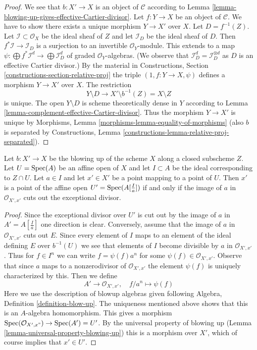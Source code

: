 \begin{proof}
We see that $b : X' \to X$ is an object of $\mathcal{C}$ according to
Lemma \ref{lemma-blowing-up-gives-effective-Cartier-divisor}.
Let $f : Y \to X$ be an object of $\mathcal{C}$. We have to show there exists
a unique morphism $Y \to X'$ over $X$. Let $D = f^{-1}(Z)$.
Let $\mathcal{I} \subset \mathcal{O}_X$ be the ideal sheaf of $Z$
and let $\mathcal{I}_D$ be the ideal sheaf of $D$. Then
$f^*\mathcal{I} \to \mathcal{I}_D$ is a surjection
to an invertible $\mathcal{O}_Y$-module. This extends to a map
$\psi : \bigoplus f^*\mathcal{I}^d \to \bigoplus \mathcal{I}_D^d$
of graded $\mathcal{O}_Y$-algebras. (We observe that
$\mathcal{I}_D^d = \mathcal{I}_D^{\otimes d}$ as $D$ is an
effective Cartier divisor.) By the material in
Constructions, Section \ref{constructions-section-relative-proj}
the triple $(1, f : Y \to X, \psi)$ defines a morphism $Y \to X'$ over $X$.
The restriction
$$
Y \setminus D \longrightarrow X' \setminus b^{-1}(Z) = X \setminus Z
$$
is unique. The open $Y \setminus D$ is scheme theoretically dense in $Y$
according to Lemma \ref{lemma-complement-effective-Cartier-divisor}.
Thus the morphism $Y \to X'$ is unique by
Morphisms, Lemma \ref{morphisms-lemma-equality-of-morphisms}
(also $b$ is separated by Constructions, Lemma
\ref{constructions-lemma-relative-proj-separated}).
\end{proof}

\begin{lemma}
\label{lemma-characterize-affine-blowup}
Let $b : X' \to X$ be the blowing up of the scheme $X$ along a closed
subscheme $Z$. Let $U = \mathop{\mathrm{Spec}}(A)$ be an affine open of $X$ and let
$I \subset A$ be the ideal corresponding to $Z \cap U$.
Let $a \in I$ and let $x' \in X'$ be a point mapping to a point of $U$.
Then $x'$ is a point of the affine open $U' = \mathop{\mathrm{Spec}}(A[\frac{I}{a}])$
if and only if the image of $a$ in $\mathcal{O}_{X', x'}$ cuts
out the exceptional divisor.
\end{lemma}

\begin{proof}
Since the exceptional divisor over $U'$ is cut out by the image of
$a$ in $A' = A[\frac{I}{a}]$ one direction is clear. Conversely, assume
that the image of $a$ in $\mathcal{O}_{X', x'}$ cuts out $E$.
Since every element of $I$ maps to an element of the ideal
defining $E$ over $b^{-1}(U)$ we see that elements of $I$ become
divisible by $a$ in $\mathcal{O}_{X', x'}$. Thus for $f \in I^n$
we can write $f = \psi(f) a^n$ for some $\psi(f) \in \mathcal{O}_{X', x'}$.
Observe that since $a$ maps to a nonzerodivisor of $\mathcal{O}_{X', x'}$
the element $\psi(f)$ is uniquely characterized by this. Then we
define
$$
A' \longrightarrow \mathcal{O}_{X', x'},\quad
f/a^n \longmapsto \psi(f)
$$
Here we use the description of blowup algebras given following
Algebra, Definition \ref{definition-blow-up}. The uniqueness mentioned
above shows that this is an $A$-algebra homomorphism.
This gives a morphism $\mathop{\mathrm{Spec}}(\mathcal{O}_{X', x"}) \to \mathop{\mathrm{Spec}}(A') = U'$.
By the universal property of blowing up
(Lemma \ref{lemma-universal-property-blowing-up})
this is a morphism over
$X'$, which of course implies that $x' \in U'$.
\end{proof}

